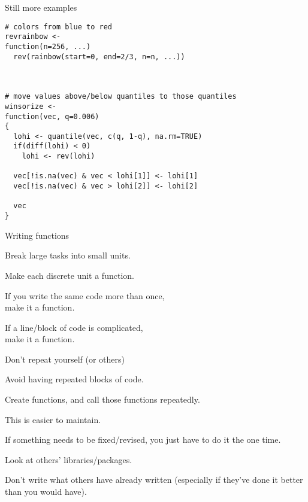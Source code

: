 \documentclass[12pt,t]{beamer}
\begin{document}
\begin{frame}[fragile,c]{Still more examples}

\begin{lstlisting}
# colors from blue to red
revrainbow <-
function(n=256, ...)
  rev(rainbow(start=0, end=2/3, n=n, ...))



# move values above/below quantiles to those quantiles
winsorize <-
function(vec, q=0.006)
{
  lohi <- quantile(vec, c(q, 1-q), na.rm=TRUE)
  if(diff(lohi) < 0)
    lohi <- rev(lohi)

  vec[!is.na(vec) & vec < lohi[1]] <- lohi[1]
  vec[!is.na(vec) & vec > lohi[2]] <- lohi[2]

  vec
}
\end{lstlisting}

\end{frame}


\begin{frame}{Writing functions}

\bbi
\item Break large tasks into small units.
  \bi
  \item Make each discrete unit a function.
  \ei
\item If you write the same code more than once, \\
{\hilit make it a function}.
\item If a line/block of code is complicated, \\
{\hilit make it a function}.
\ei

\end{frame}


\begin{frame}{Don't repeat yourself (or others)}

\bbi
\item Avoid having repeated blocks of code.
\item Create functions, and call those functions repeatedly.
\item This is easier to maintain.
  \bi
  \item If something needs to be fixed/revised, you just have to do it
    the one time.
  \ei
\item Look at others' libraries/packages.
  \bi
  \item Don't write what others have already written (especially if
    they've done it better than you would have).
  \ei
\ei

\end{frame}
\end{document}
